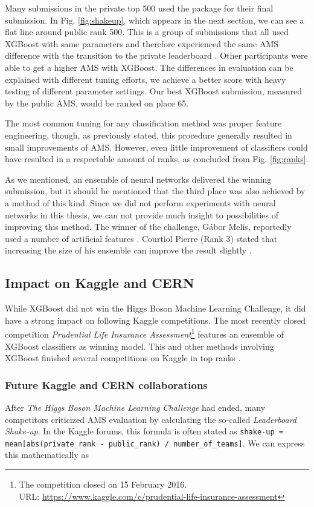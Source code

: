 Many submissions in the private top 500 used the package for their final submission. In Fig. \ref{fig:shakeup}, which appears in the next section, we can see a flat line around public rank 500. This is a group of submissions that all used XGBoost with same parameters and therefore experienced the same AMS difference with the transition to the private leaderboard \cite{hebert}.
Other participants were able to get a higher AMS with XGBoost. The differences in evaluation can be explained with different tuning efforts, we achieve a better score with heavy testing of different parameter settings. Our best XGBoost submission, measured by the public AMS, would be ranked on place 65.

The most common tuning for any classification method was proper feature engineering, though, as previously stated, this procedure generally resulted in small improvements of AMS. However, even little improvement of classifiers could have resulted in a respectable amount of ranks, as concluded from Fig. \ref{fig:ranks}.

As we mentioned, an ensemble of neural networks delivered the winning submission, but it should be mentioned that the third place was also achieved by a method of this kind.
Since we did not perform experiments with neural networks in this thesis, we can not provide much insight to possibilities of improving this method. The winner of the challenge, Gábor Melis, reportedly used a number of artificial features \cite{meli14}. Courtiol Pierre (Rank 3) stated that increasing the size of his ensemble can improve the result slightly \cite{courtiol-3rd}.

\subsection{Impact on Kaggle and CERN}
While XGBoost did not win the Higgs Boson Machine Learning Challenge, it did have a strong impact on following Kaggle competitions. The most recently closed competition \emph{Prudential Life Insurance Assessment}\footnote{The competition closed on 15 February 2016.\\ URL: \url{https://www.kaggle.com/c/prudential-life-insurance-assessment}} features an ensemble of XGBoost classifiers as winning model. This and other methods involving XGBoost finished several competitions on Kaggle in top ranks \cite{xgbdoc}.

\subsubsection{Future Kaggle and CERN collaborations}
After \emph{The Higgs Boson Machine Learning Challenge} had ended, many competitors criticized AMS evaluation by calculating the so-called \emph{Leaderboard Shake-up}. In the Kaggle forums, this formula is often stated as \texttt{shake-up = mean[abs(private\_rank - public\_rank) / number\_of\_teams]}. We can express this mathematically as

